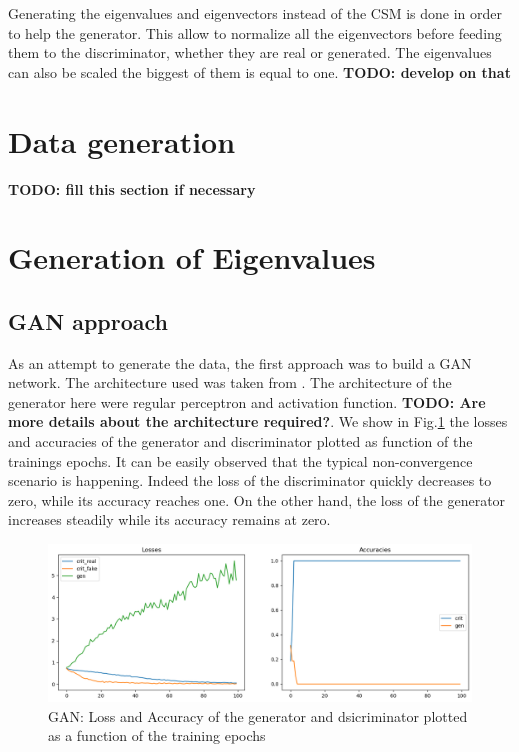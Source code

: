 \documentclass{article}
\begin{document}
Generating the eigenvalues and eigenvectors instead of the CSM is done in order to help the generator. This allow to normalize all the eigenvectors before feeding them to the discriminator, whether they are real or generated. The eigenvalues can also be scaled the biggest of them is equal to one. \textbf{TODO: develop on that} 

\section{Data generation}

\textbf{TODO: fill this section if necessary} 

\section{Generation of Eigenvalues}



\subsection{GAN approach}

As an attempt to generate the data, the first approach was to build a GAN network. The architecture used was taken from \cite{eriklindernoren}. The architecture of the generator here were regular perceptron and activation function. \textbf{TODO: Are more details about the architecture required?}. We show in Fig.\ref{fig:GAN_evals_loss_acc} the losses and accuracies of the generator and discriminator plotted as function of the trainings epochs. It can be easily observed that the typical non-convergence scenario is happening. Indeed the loss of the discriminator quickly decreases to zero, while its accuracy reaches one. On the other hand, the loss of the generator increases steadily while its accuracy remains at zero.

\begin{figure}
    \centering
    \includegraphics[width=\textwidth]{../figs/GAN_evals_loss_acc.png}
    \caption{GAN: Loss and Accuracy of the generator and dsicriminator plotted as a function of the training epochs}
    \label{fig:GAN_evals_loss_acc}
\end{figure}
\end{document}
